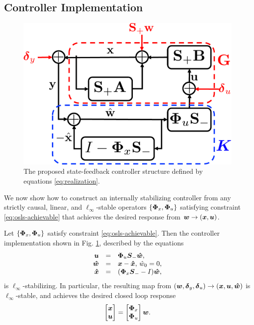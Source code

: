 \subsection{Controller Implementation}
\begin{figure}
\centering
\includegraphics[width=.35\textwidth]{interconnect}
\caption{The proposed state-feedback controller structure defined by equations \eqref{eq:realization}.}
\label{fig:realization}
\end{figure}
We now show how to construct an internally stabilizing controller from any strictly causal, linear, and $\ell_\infty$-stable operators $\left \{\boldsymbol{\Phi}_x,\boldsymbol{\Phi}_u\right\}$ satisfying constraint \eqref{eq:osls-achievable} that achieves the desired response from $\boldsymbol{w} \to (\boldsymbol{x}, \boldsymbol{u})$.
\begin{proposition}\label{prop:sufficiency}
Let $\left\{\boldsymbol{\Phi}_x,\boldsymbol{\Phi}_u\right\}$ satisfy constraint \eqref{eq:osls-achievable}.  Then the controller implementation shown in Fig. \ref{fig:realization}, described by the equations
\begin{equation}
\begin{array}{rcl}
\boldsymbol{u} &=& \boldsymbol{\Phi}_u \boldsymbol{S}_- \boldsymbol{\hat w},\\
 \boldsymbol{\hat w}  &=&  \boldsymbol{x} - \boldsymbol{\hat x}, \, \hat{w}_0 = 0, \\
\boldsymbol{\hat x} &=& (\boldsymbol{\Phi}_x\boldsymbol{S}_--I)\boldsymbol{\hat w},
\end{array}
\label{eq:realization}
\end{equation}
is $\ell_\infty$-stabilizing.  In particular, the resulting map from $(\boldsymbol{w}, \boldsymbol{\delta}_y, \boldsymbol{\delta}_u) \to (\boldsymbol{x}, \boldsymbol{u}, \boldsymbol{\hat w})$ is $\ell_\infty$-stable, and achieves the desired closed loop response
\begin{equation}
\begin{bmatrix} \boldsymbol{x} \\ \boldsymbol{u} \end{bmatrix} = \begin{bmatrix} \boldsymbol{\Phi}_x \\ \boldsymbol{\Phi}_u \end{bmatrix}\boldsymbol{w}.
\label{eq:response}
\end{equation}
\end{proposition}
